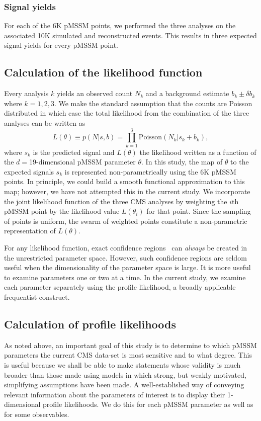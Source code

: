 \subsubsection{Signal yields}
\label{sec:sigyield}

For each of the 6K pMSSM points, we performed the three analyses on the associated 10K simulated and reconstructed events. This results in three expected signal yields for every pMSSM point. 


\subsection{Calculation of the likelihood function}

Every analysis $k$ yields an observed count $N_k$ and a background estimate
$b_k \pm \delta b_k$ where $k=1,2,3$.  We make the standard assumption that the
counts are Poisson distributed in which case the total likelihood from the combination of the three analyses can be written as
\begin{equation}
L(\theta) \equiv p(N|s,b) = \prod_{k=1}^3 \mbox{Poisson}(N_k | s_k + b_k),
\end{equation}
where $s_k$ is the predicted signal and $L(\theta)$ the likelihood
written as a function of the  $d = $19-dimensional pMSSM parameter $\theta$. 
In this study, the
 map of $\theta$ to the expected signals $s_k$ is represented non-parametrically
 using the 6K pMSSM points. In principle, we could build a smooth functional approximation to
 this map; however, we have not attempted this in the current study. 
 We incorporate the joint likelihood function of the three CMS analyses by
 weighting the $i$th pMSSM point by the likelihood 
 value $L(\theta_i)$ for that point. Since the sampling of points is uniform, the swarm of weighted
 points constitute a non-parametric representation of $L(\theta)$.
 
 For any likelihood function, exact confidence regions~\cite{James}  can \emph{always} 
 be created in
 the unrestricted parameter space. However, such
 confidence regions are seldom useful when the dimensionality of the 
 parameter space is large. It is 
 more useful to examine parameters one or two at a time. In the current study,
 we examine each parameter separately using the profile likelihood, a broadly applicable frequentist
 construct.

\subsection{Calculation of profile likelihoods}
As noted above, an important goal of this study is to determine to which pMSSM parameters the current  CMS data-set is most sensitive and to what degree. This is useful because we shall
be able to make statements whose validity is much broader than those made using
models in which strong, but weakly motivated, simplifying assumptions have been made.  A well-established way of conveying relevant information about the parameters of interest
 is to display their 1-dimensional profile likelihoods. We do this for each pMSSM parameter
as well as for some observables.

